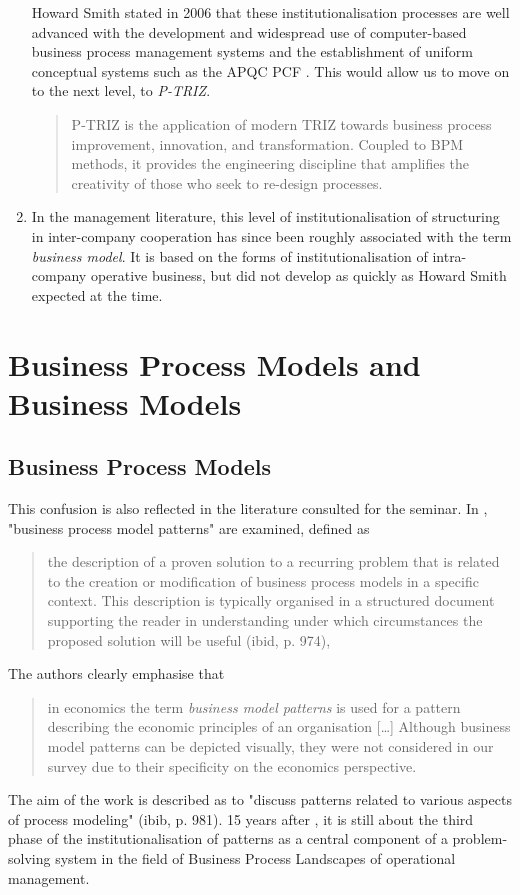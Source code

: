 \documentclass[11pt,a4paper]{article}
\begin{document}
\begin{enumerate}
  Howard Smith \cite{Smith2006} stated in 2006 that these institutionalisation
  processes are well advanced with the development and widespread use of
  computer-based business process management systems and the establishment of
  uniform conceptual systems such as the APQC PCF \cite{APQC}. This would
  allow us to move on to the next level, to \emph{P-TRIZ}.
  \begin{quote}
    P-TRIZ is the application of modern TRIZ towards business process
    improvement, innovation, and transformation. Coupled to BPM methods, it
    provides the engineering discipline that amplifies the creativity of those
    who seek to re-design processes. \cite{Smith2006}
  \end{quote}
\item In the management literature, this level of institutionalisation of
  structuring in inter-company cooperation has since been roughly associated
  with the term \emph{business model}. It is based on the forms of
  institutionalisation of intra-company operative business, but did not
  develop as quickly as Howard Smith expected at the time.
\end{enumerate}

\section{Business Process Models and Business Models}

\subsection{Business Process Models}

This confusion is also reflected in the literature consulted for the seminar.
In \cite{Fellmann2018}, "business process model patterns" are examined,
defined as
\begin{quote}
  the description of a proven solution to a recurring problem that is related
  to the creation or modification of business process models in a specific
  context. This description is typically organised in a structured document
  supporting the reader in understanding under which circumstances the
  proposed solution will be useful (ibid, p. 974),
\end{quote}
The authors clearly emphasise that 
\begin{quote}
  in economics the term \emph{business model patterns} is used for a pattern
  describing the economic principles of an organisation [\ldots] Although
  business model patterns can be depicted visually, they were not considered
  in our survey due to their specificity on the economics perspective.
\end{quote}
The aim of the work is described as to "discuss patterns related to various
aspects of process modeling" (ibib, p. 981). 15 years after \cite{Smith2006},
it is still about the third phase of the institutionalisation of patterns as a
central component of a problem-solving system in the field of Business Process
Landscapes of operational management.
\end{document}
